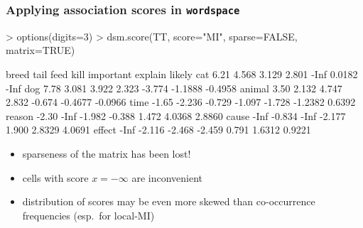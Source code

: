 \documentclass[t]{beamer} %
\begin{document}
\begin{frame}[fragile]
  \frametitle{Applying association scores in \texttt{wordspace}}

\ungap[1]
\begin{Rcode}
> options(digits=3) 
> dsm.score(TT, score="MI", sparse=FALSE, matrix=TRUE)\begin{Rout}
       breed   tail   feed   kill important explain  likely
cat     6.21  4.568  3.129  2.801      -Inf  0.0182    -Inf
dog     7.78  3.081  3.922  2.323    -3.774 -1.1888 -0.4958
animal  3.50  2.132  4.747  2.832    -0.674 -0.4677 -0.0966
time   -1.65 -2.236 -0.729 -1.097    -1.728 -1.2382  0.6392
reason -2.30   -Inf -1.982 -0.388     1.472  4.0368  2.8860
cause   -Inf -0.834   -Inf -2.177     1.900  2.8329  4.0691
effect  -Inf -2.116 -2.468 -2.459     0.791  1.6312  0.9221\end{Rout}
\end{Rcode}

\begin{itemize}
\item<2->[\hand] sparseness of the matrix has been lost!
\item<2->[\hand] cells with score $x = -\infty$ are inconvenient
\item<2->[\hand] distribution of scores may be even more skewed than co-occurrence frequencies (esp.\ for local-MI)
\end{itemize}
\end{frame}
\end{document}
